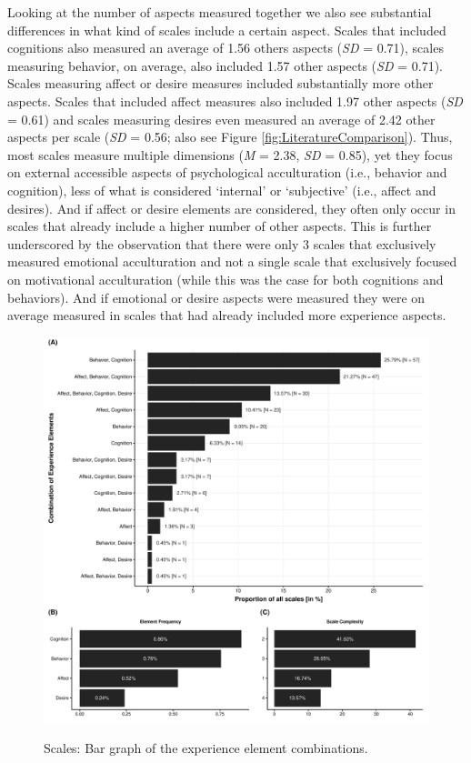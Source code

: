 Looking at the number of aspects measured together we also see
substantial differences in what kind of scales include a certain aspect.
Scales that included cognitions also measured an average of 1.56 others
aspects (\textit{SD} = 0.71), scales measuring behavior, on average,
also included 1.57 other aspects (\textit{SD} = 0.71). Scales measuring
affect or desire measures included substantially more other aspects.
Scales that included affect measures also included 1.97 other aspects
(\textit{SD} = 0.61) and scales measuring desires even measured an
average of 2.42 other aspects per scale (\textit{SD} = 0.56; also see
Figure \ref{fig:LiteratureComparison}). Thus, most scales measure
multiple dimensions (\textit{M} = 2.38, \textit{SD} = 0.85), yet they
focus on external accessible aspects of psychological acculturation
(i.e., behavior and cognition), less of what is considered `internal' or
`subjective' (i.e., affect and desires). And if affect or desire
elements are considered, they often only occur in scales that already
include a higher number of other aspects. This is further underscored by
the observation that there were only 3 scales that exclusively measured
emotional acculturation and not a single scale that exclusively focused
on motivational acculturation (while this was the case for both
cognitions and behaviors). And if emotional or desire aspects were
measured they were on average measured in scales that had already
included more experience aspects.

\begin{figure}[h]
\centering
\caption{Scales: Bar graph of the experience element combinations.}
\includegraphics[width=\textwidth]{Figures/ABCDFreq-1}
\label{fig:ElementsScales}
\end{figure}


